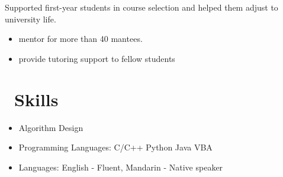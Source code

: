 \documentclass{resume}
\begin{document}
Supported first-year students in course selection and helped them adjust to university life.
\begin{itemize}
  \item mentor for more than 40 mantees.
\end{itemize}

\begin{itemize}
  \item provide tutoring support to fellow students
\end{itemize}

\section{\ Skills}%
\begin{itemize}[parsep=0.5ex]
  \item Algorithm Design
  \item Programming Languages: C/C++ Python Java VBA
  \item Languages: English - Fluent, Mandarin - Native speaker
\end{itemize}



%
%
\end{document}
